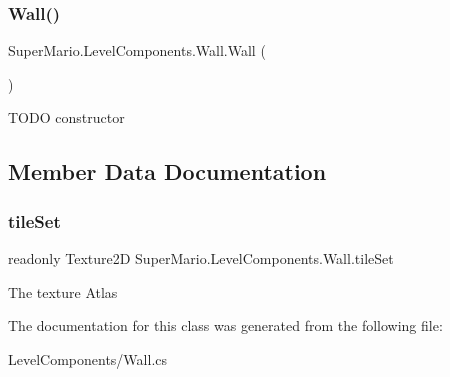 \subsubsection{\texorpdfstring{Wall()}{Wall()}}
{\footnotesize\ttfamily Super\+Mario.\+Level\+Components.\+Wall.\+Wall (\begin{DoxyParamCaption}{ }\end{DoxyParamCaption})}



T\+O\+DO constructor 



\subsection{Member Data Documentation}
\mbox{\label{class_super_mario_1_1_level_components_1_1_wall_a336f1410914c4832d5db575a8540183b}} 
\subsubsection{\texorpdfstring{tile\+Set}{tileSet}}
{\footnotesize\ttfamily readonly Texture2D Super\+Mario.\+Level\+Components.\+Wall.\+tile\+Set}



The texture Atlas 



The documentation for this class was generated from the following file\+:\begin{DoxyCompactItemize}
\item 
Level\+Components/Wall.\+cs\end{DoxyCompactItemize}
